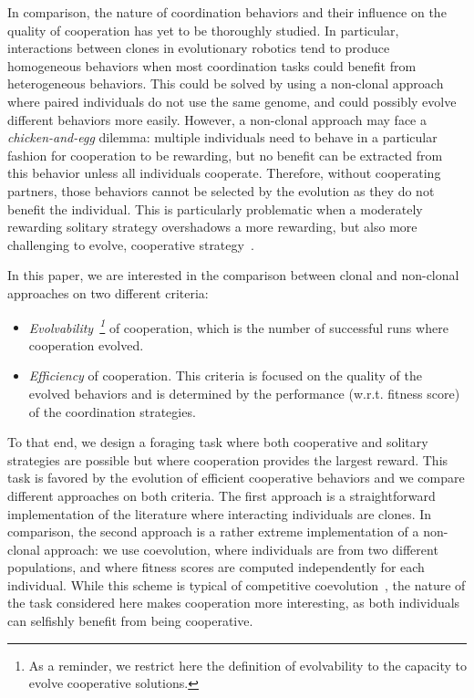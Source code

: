   In comparison, the nature of coordination behaviors and their influence on the quality of cooperation has yet to be thoroughly studied. In particular, interactions between clones in evolutionary robotics tend to produce homogeneous behaviors when most coordination tasks could benefit from heterogeneous behaviors. This could be solved by using a non-clonal approach where paired individuals do not use the same genome, and could possibly evolve different behaviors more easily. However, a non-clonal approach may face a \emph{chicken-and-egg} dilemma: multiple individuals need to behave in a particular fashion for cooperation to be rewarding, but no benefit can be extracted from this behavior unless all individuals cooperate. Therefore, without cooperating partners, those behaviors cannot be selected by the evolution as they do not benefit the individual. This is particularly problematic when a moderately rewarding solitary strategy overshadows a more rewarding, but also more challenging to evolve, cooperative strategy~\parencite{Skyrms2004}.

  In this paper, we are interested in the comparison between clonal and non-clonal approaches on two different criteria:
 \begin{itemize}
    \item{\emph{Evolvability~\footnote{As a reminder, we restrict here the definition of evolvability to the capacity to evolve cooperative solutions.}} of cooperation, which is the number of successful runs where cooperation evolved.}
    \item{\emph{Efficiency} of cooperation. This criteria is focused on the quality of the evolved behaviors and is determined by the performance (w.r.t. fitness score) of the coordination strategies.}
  \end{itemize}

  To that end, we design a foraging task where both cooperative and solitary strategies are possible but where cooperation provides the largest reward. This task is favored by the evolution of efficient cooperative behaviors and we compare different approaches on both criteria. The first approach is a straightforward implementation of the literature where interacting individuals are clones. In comparison, the second approach is a rather extreme implementation of a non-clonal approach: we use coevolution, where individuals are from two different populations, and where fitness scores are computed independently for each individual. While this scheme is typical of competitive coevolution~\parencite{Floreano1997, Floreano1998, Panait2005}, the nature of the task considered here makes cooperation more interesting, as both individuals can selfishly benefit from being cooperative.

